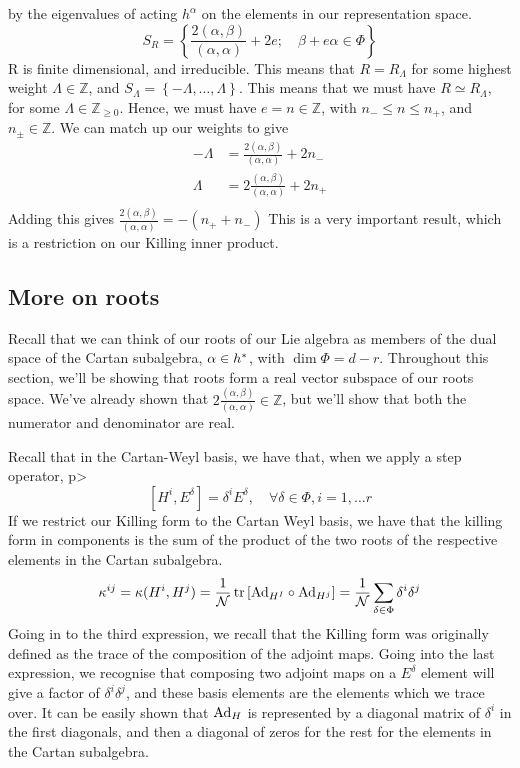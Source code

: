 by the eigenvalues of acting $ h ^ \alpha $ on the 
elements in our representation space. 
\[
S_{ R }  = \left\{  \frac{2 ( \alpha, \beta ) }{ ( \alpha, \alpha ) } +  2 e ; \quad  
\beta + e \alpha \in \Phi \right\} 
\] R is finite dimensional, and irreducible.
This means that $ R  =R _{ \Lambda } $ for 
some highest weight $ \Lambda \in \mathbb{ Z} $, and 
$ S _{ \Lambda }  = \left\{   - \Lambda , \dots, \Lambda  \right\}  $. 
This means that we must have $ R \simeq R_{\Lambda } $,
for some $ \Lambda \in \mathbb{ Z} _{ \geq 0  } $. 
Hence, we must have $ e = n \in \mathbb{ Z} $, with 
$ n _ - \leq n \leq n _ + $, and $ n_{ \pm } \in \mathbb{ Z} $. 
We can match up our weights to give 
\begin{align*}
- \Lambda &  = \frac{ 2 ( \alpha , \beta ) }{ ( \alpha, \alpha ) } + 2 n_ - \\
\Lambda &=   2 \frac{ ( \alpha, \beta ) }{ ( \alpha, \alpha )   } + 2 n _ +   \\
\end{align*}
Adding this gives $ \frac{ 2 ( \alpha , \beta ) }{ ( \alpha , \alpha ) }  = - ( n _ + + n _ - ) $
This is a very important result, 
which is a restriction on our Killing inner product. 


\subsection{More on roots}
Recall that we can think 
of our roots of our Lie algebra as members 
of the dual space of the Cartan subalgebra, $ \alpha \in  h ^ *  $, 
with $ \dim \Phi = d - r $. 
Throughout this section, we'll 
be showing that roots form a real vector subspace of our roots space. 
We've already shown that $ 2 \frac{ ( \alpha , \beta ) }{ ( \alpha , \alpha ) } \in 
\mathbb{ Z} $, but we'll show that both the numerator and 
denominator are real. 

Recall that in the Cartan-Weyl basis, 
we have that, when we apply a step operator,  
p> 
\[
\left[  H ^ i , E ^ \delta  \right]   = \delta ^ i E ^ \delta , 
\quad \forall \delta \in \Phi , i = 1 , \dots r 
\]  
If we restrict our Killing form 
to the Cartan Weyl basis, we have that 
the killing form in components is the sum of the 
product of the two roots of the respective 
elements in the Cartan subalgebra. 
\[
\kappa ^{ ij }  = \kappa ( H ^ i , H ^ j ) 
= \frac{1}{\mathcal{ N  } } \tr \left[  
\text{Ad}_{ H ^ I }  \circ \text{Ad} _{ H ^ j }\right]  = \frac{1}{\mathcal{ N } } 
\sum_{ \delta \in \Phi } \delta ^ i \delta ^ j 
\] Going in to the third expression, 
we recall that the Killing form was originally 
defined as the trace of the composition 
of the adjoint maps. Going into the last expression, 
we recognise that composing two adjoint maps 
on a $ E^ \delta $ element will give a factor of 
$ \delta ^ i \delta ^ j $, and these basis elements 
are the elements which we trace over. It can be easily shown that $ \text{Ad}_H $ is represented by 
a diagonal matrix of $ \delta ^ i $ in the first diagonals, and then 
a diagonal of zeros for the rest for the elements 
in the Cartan subalgebra.

